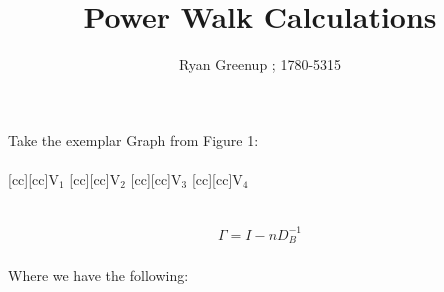 \documentclass[12 pt]{article}
\title{\color{coltit} \Huge Power Walk Calculations}
\author{Ryan Greenup ; 1780-5315}
\begin{document}
\maketitle

Take the exemplar Graph from Figure 1:
\ \\
\ \\
[cc][cc]{$\mathrm{V}_1$}
[cc][cc]{$\mathrm{V}_2$}
[cc][cc]{$\mathrm{V}_3$}
[cc][cc]{$\mathrm{V}_4$}

\ \\

$$
\begin{aligned}
    \Gamma =  I - n D^{- 1}_B \\
\end{aligned}
$$

Where we have the following:
\end{document}
